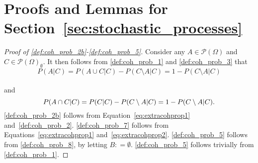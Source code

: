 \documentclass[10pt,a4paper]{paper}
\theoremstyle{definition}
\newcommand{\paths}{\Omega}
\newcommand{\power}{\mathcal{P}(\paths)}
\newcommand{\nonemptypower}{\power_{\emptyset}}
\newcommand{\coloneqq}{:\!=}
\begin{document}

\section{Proofs and Lemmas for Section~\ref{sec:stochastic_processes}}\label{app:stoch_proc}

\begin{proof}[Proof of \ref{def:coh_prob_2b}-\ref{def:coh_prob_5}]
Consider any $A\in\power$ and $C\in\nonemptypower$. It then follows from \ref{def:coh_prob_1} and \ref{def:coh_prob_3} that
\vspace{-7pt}
\begin{equation}\label{eq:extracohprop1}
P(A\vert C)
=P(A\cup C\vert C)-P(C\setminus A\vert C)
=1-P(C\setminus A\vert C)
\end{equation}\\[-20pt]
and
\begin{equation}\label{eq:extracohprop2}
P(A\cap C\vert C)
=P(C\vert C)-P(C\setminus A\vert C)
=1-P(C\setminus A\vert C).
\vspace{6pt}
\end{equation}
\ref{def:coh_prob_2b} follows from Equation~\eqref{eq:extracohprop1} and~\ref{def:coh_prob_2}. \ref{def:coh_prob_7} follows from Equations~\eqref{eq:extracohprop1} and~\eqref{eq:extracohprop2}. \ref{def:coh_prob_5} follows from \ref{def:coh_prob_8}, by letting $B\coloneqq\emptyset$. \ref{def:coh_prob_5} follows trivially from \ref{def:coh_prob_1}.
\end{proof}
\end{document}
